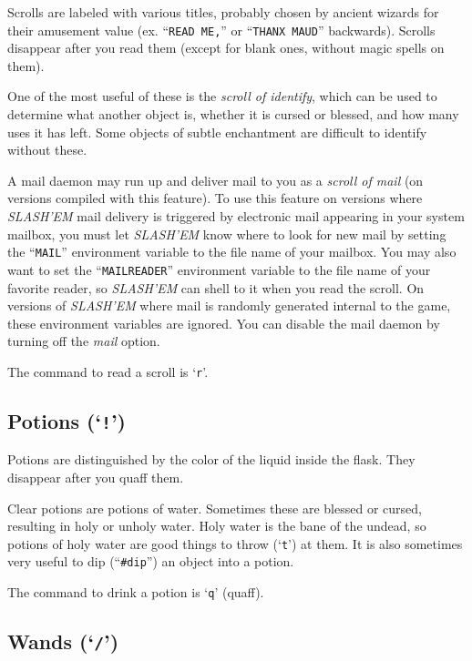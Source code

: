 
Scrolls are labeled with various titles, probably chosen by ancient wizards
for their amusement value (ex. ``{\tt READ ME,}'' or ``{\tt THANX MAUD}'' backwards).
Scrolls disappear after you read them (except for blank ones, without
magic spells on them).

One of the most useful of these is the {\it scroll of identify}, which
can be used to determine what another object is, whether it is cursed or
blessed, and how many uses it has left.  Some objects of subtle
enchantment are difficult to identify without these.

A mail daemon may run up and deliver mail to you as a
{\it scroll of mail\/} (on versions compiled with this feature).
To use this feature on versions where {\it SLASH'EM\/} mail delivery is triggered
by electronic mail appearing in your system mailbox,
you must let {\it SLASH'EM\/} know where to look for new mail by setting
the ``{\tt MAIL}'' environment variable to the file name of your mailbox.
You may also want to set the ``{\tt MAILREADER}'' environment
variable to the file name of your favorite reader, so {\it SLASH'EM\/} can shell to it
when you read the scroll.
On versions of {\it SLASH'EM\/} where mail is randomly generated internal to the game,
these environment variables are ignored.
You can disable the mail daemon by turning off the
{\it mail\/} 
option.

The command to read a scroll is `{\tt r}'.
\subsection*{Potions (`{\tt !}')}


Potions are distinguished by the color of the liquid inside the flask.
They disappear after you quaff them.

Clear potions are potions of water.  Sometimes these are blessed or cursed,
resulting in holy or unholy water.  Holy water is the bane of the undead, so
potions of holy water are good things to throw (`{\tt t}') at them.  It is also
sometimes very useful to dip (``{\tt \#dip}'') an object into a potion.

The command to drink a potion is `{\tt q}' (quaff).
\subsection*{Wands (`{\tt /}')}

